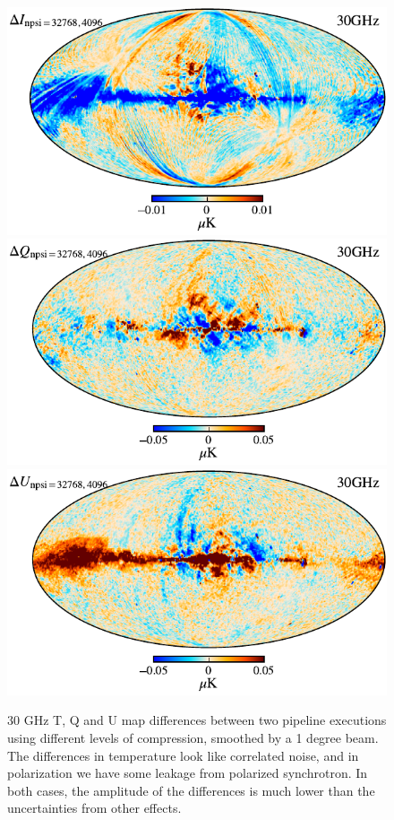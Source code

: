 \documentclass[twocolumn]{aa}
\begin{document}
\begin{figure}[t]
  \center
  \includegraphics[width=\linewidth]{figs/compression_diff_I.pdf}\\
  \includegraphics[width=\linewidth]{figs/compression_diff_Q.pdf}\\
  \includegraphics[width=\linewidth]{figs/compression_diff_U.pdf}
  \caption{30 GHz T, Q and U map differences between two pipeline executions using different levels of compression, smoothed by a 1 degree beam. The differences in temperature look like correlated noise, and in polarization we have some leakage from polarized synchrotron. In both cases, the amplitude of the differences is much lower than the uncertainties from other effects. 
  }\label{fig:compressiondiff}
\end{figure}
\end{document}

